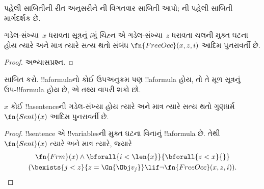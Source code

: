 \documentclass[../../../include/open-logic-section]{subfiles}
\begin{document}
\begin{prob}
પહેલી સાબિતીની રીત અનુસરીને
ની
વિગતવાર સાબિતી આપો;
ની
પહેલી સાબિતી માર્ગદર્શક છે.
\end{prob}

\begin{prop}
ગડેલ-સંખ્યા~$x$ ધરાવતા સૂત્રનું
$i$મું ચિહ્ન એ ગડેલ-સંખ્યા~$z$
ધરાવતા ચલની મુક્ત ઘટના હોય ત્યારે
અને માત્ર ત્યારે સત્ય થતો સંબંધ
$\fn{FreeOcc}(x, z, i)$ આદિમ
પુનરાવર્તી છે.
\end{prop}

\begin{proof}
અભ્યાસપ્રશ્ન.
\end{proof}

\begin{prob}
સાબિત કરો. !!a{formula}નો કોઈ
ઉપઅનુક્રમ પણ !!a{formula} હોય, તો
તે મૂળ સૂત્રનું ઉપ-!!{formula} હોય છે,
એ તથ્ય વાપરી શકો છો.
\end{prob}

\begin{prop}
$x$ કોઈ !!a{sentence}ની ગડેલ-સંખ્યા
હોય ત્યારે અને માત્ર ત્યારે સત્ય થતો
ગુણધર્મ~$\fn{Sent}(x)$ આદિમ
પુનરાવર્તી છે.
\end{prop}

\begin{proof}
!!{sentence} એ !!{variable}sની મુક્ત
ઘટના વિનાનું !!a{formula} છે. તેથી
$\fn{Sent}(x)$ ત્યારે અને માત્ર ત્યારે,
જ્યારે
\begin{multline*}
\fn{Frm}(x) \land \bforall{i<\len{x}}{\bforall{z<x}{}}\\
(\bexists{j<z}{z=\Gn{\Obj v_j}} \lif \lnot\fn{FreeOcc}(x,z,i)).
\end{multline*}
\end{proof}
\end{document}
